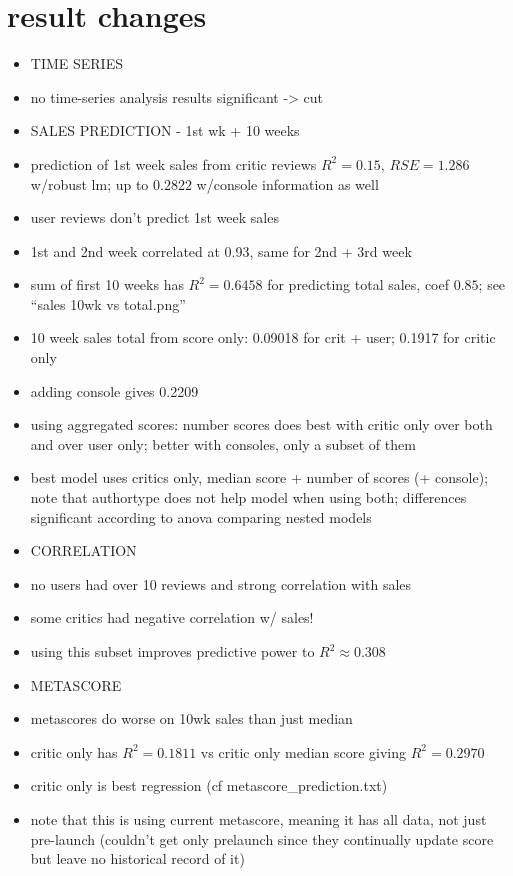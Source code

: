 \documentclass[letterpaper]{article}
\begin{document}
\section{result changes}
\begin{itemize}
\item TIME SERIES
\item no time-series analysis results significant -> cut
\item SALES PREDICTION - 1st wk + 10 weeks
\item prediction of 1st week sales from critic reviews $R^2 = 0.15$, $RSE = 1.286$ w/robust lm; up to $0.2822$ w/console information as well
\item user reviews don't predict 1st week sales
\item 1st and 2nd week correlated at 0.93, same for 2nd + 3rd week
\item sum of first 10 weeks has $R^2 = 0.6458$ for predicting total sales, coef $0.85$; see ``sales 10wk vs total.png''
\item 10 week sales total from score only: 0.09018 for crit + user; 0.1917 for critic only
\item adding console gives 0.2209
\item using aggregated scores: number scores does best with critic only over both and over user only; better with consoles, only a subset of them
\item best model uses critics only, median score + number of scores (+ console); note that authortype does not help model when using both; differences significant according to anova comparing nested models
\item CORRELATION
\item no users had over 10 reviews and strong correlation with sales
\item some critics had negative correlation w/ sales!
\item using this subset improves predictive power to $R^2 \approx 0.308$
\item METASCORE
\item metascores do worse on 10wk sales than just median
\item critic only has $R^2 = 0.1811$ vs critic only median score giving $R^2 = 0.2970$
\item critic only is best regression (cf metascore\_prediction.txt)
\item note that this is using current metascore, meaning it has all data, not just pre-launch (couldn't get only prelaunch since they continually update score but leave no historical record of it)
\end{itemize}
\end{document}
